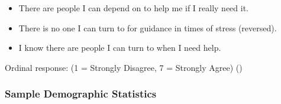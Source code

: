 \documentclass[
  single column]{article}
\providecommand{\tightlist}{%
  \setlength{\itemsep}{0pt}\setlength{\parskip}{0pt}}\usepackage{longtable,booktabs,array}
\begin{document}
\begin{itemize}
\tightlist
\item
  There are people I can depend on to help me if I really need it.
\item
  There is no one I can turn to for guidance in times of stress
  (reversed).
\item
  I know there are people I can turn to when I need help.
\end{itemize}

Ordinal response: (1 = Strongly Disagree, 7 = Strongly Agree)
()

\subsubsection{Sample Demographic
Statistics}\label{sample-demographic-statistics}

\begingroup\fontsize{6}{8}\selectfont
\begingroup\fontsize{6}{8}\selectfont
\end{document}
